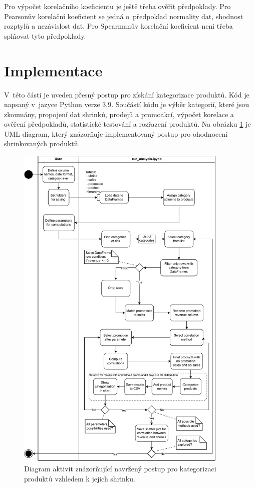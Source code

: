 Pro výpočet korelačního koeficientu je ještě třeba ověřit předpoklady. Pro Pearsonův korelační koeficient se jedná o~předpoklad normality dat, shodnost rozptylů a nezávislost dat. Pro Spearmanův korelační koeficient není třeba splňovat tyto předpoklady.

\section{Implementace}

V~této části je uveden přesný postup pro získání kategorizace produktů. Kód je napsaný v~jazyce Python verze 3.9. Součástí kódu je výběr kategorií, které jsou zkoumány, propojení dat shrinků, prodejů a promoakcí, výpočet korelace a ověření předpokladů, statistické testování a rozřazení produktů. Na obrázku 
 \ref{obr:flowchartUML} je UML diagram, který znázorňuje implementovaný postup pro ohodnocení shrinkovaných produktů. 

\begin{figure}[h!]
    \centering
    \captionsetup{justification=centering}
    \includegraphics[width=0.90\textwidth]{obrazky/flowchart1.pdf}
    \caption{Diagram aktivit znázorňující navržený postup pro kategorizaci\\  produktů vzhledem k jejich shrinku.}
    \label{obr:flowchartUML}
\end{figure}


